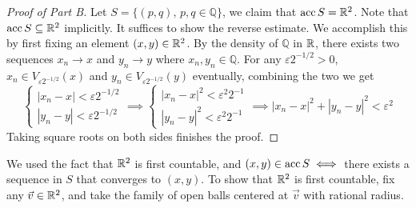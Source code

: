 \documentclass[../../main.tex]{subfiles}
\begin{document}
\begin{proof}[Proof of Part B]
    Let $S = \{(p,q),\, p,q\in\mathbb{Q}\}$, we claim that $\operatorname{acc}{S}=\mathbb{R}^2$. Note that $\operatorname{acc}{S}\subseteq\mathbb{R}^2$ implicitly. It suffices to show the reverse estimate. We accomplish this by first fixing an element $(x,y)\in\mathbb{R}^2$. By the density of $\mathbb{Q}$ in $\mathbb{R}$, there exists two sequences $x_n\to x$ and $y_n\to y$ where $x_n,y_n\in\mathbb{Q}$. For any ${\varepsilon 2^{-1/2}}>0$, $x_n\in V_{\varepsilon 2^{-1/2}}(x)$ and $y_n\in V_{\varepsilon 2^{-1/2}}(y)$ eventually, combining the two we get
    \[
       \begin{cases}
        |x_n-x|<{\varepsilon 2^{-1/2}}\\
        |y_n-y|<{\varepsilon 2^{-1/2}}
       \end{cases}
       \implies
       \begin{cases}
        |x_n-x|^2<{\varepsilon^2 2^{-1}}\\
        |y_n-y|^2<{\varepsilon^2 2^{-1}}
       \end{cases}
       \implies |x_n-x|^2+|y_n-y|^2<\varepsilon^2
    \]
    Taking square roots on both sides finishes the proof.
\end{proof}
\begin{remark}
    We used the fact that $\mathbb{R}^2$ is first countable, and $(x,y)\in\operatorname{acc}{S}\iff$ there exists a sequence in $S$ that converges to $(x,y)$. To show that $\mathbb{R}^2$ is first countable, fix any $\vec{v}\in\mathbb{R}^2$, and take the family of open balls centered at $\vec{v}$ with rational radius.
\end{remark}
\end{document}
